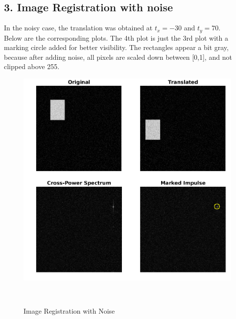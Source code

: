 \documentclass[12pt, a4paper]{article}
\begin{document}
\subsection*{3. Image Registration with noise}
In the noisy case, the translation was obtained at $t_x = -30$ and $t_y = 70$. \\
Below are the corresponding plots. The 4th plot is just the 3rd plot with a marking circle added for better visibility. The rectangles appear a bit gray, because after adding noise, all pixels are scaled down between [0,1], and not clipped above 255. 
\vspace*{65pt}
\begin{figure}[h!]
    \centering
    \renewcommand{\thefigure}{5.2}
    \begin{minipage}[c][1\width]{0.7\textwidth}
    	\hspace*{-0.8in}
    	\includegraphics[width=1.34\textwidth]{noisy.png}
    	\caption{Image Registration with Noise}
	    \label{fig:5.2}
    \end{minipage} \\
\end{figure}
\vspace*{40pt}
\newpage
\end{document}
